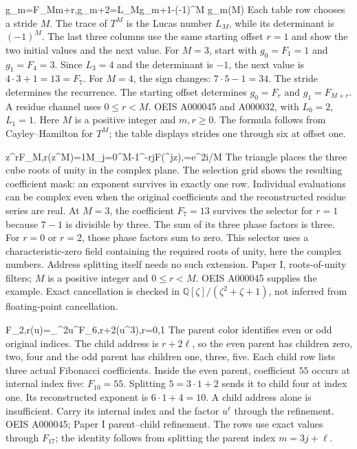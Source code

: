 {g_m=F_{Mm+r},\qquad g_{m+2}=L_Mg_{m+1}-(-1)^M g_m\quad(M)}
{Each table row chooses a stride $M$. The trace of $T^M$ is the Lucas number $L_M$, while its determinant is $(-1)^M$. The last three columns use the same starting offset $r=1$ and show the two initial values and the next value.}
{For $M=3$, start with $g_0=F_1=1$ and $g_1=F_4=3$. Since $L_3=4$ and the determinant is $-1$, the next value is $4\cdot3+1=13=F_7$. For $M=4$, the sign changes: $7\cdot5-1=34$.}
{The stride determines the recurrence. The starting offset determines $g_0=F_r$ and $g_1=F_{M+r}$. A residue channel uses $0\le r<M$.}
{OEIS A000045 and A000032, with $L_0=2$, $L_1=1$. Here $M$ is a positive integer and $m,r\ge0$. The formula follows from Cayley--Hamilton for $T^M$; the table displays strides one through six at offset one.}

{z^rF_{M,r}(z^M)=\frac1M\sum_{j=0}^{M-1}\zeta^{-rj}F(\zeta^jz),\qquad \zeta=e^{2\pi i/M}}
{The triangle places the three cube roots of unity in the complex plane. The selection grid shows the resulting coefficient mask: an exponent survives in exactly one row. Individual evaluations can be complex even when the original coefficients and the reconstructed residue series are real.}
{At $M=3$, the coefficient $F_7=13$ survives the selector for $r=1$ because $7-1$ is divisible by three. The sum of its three phase factors is three. For $r=0$ or $r=2$, those phase factors sum to zero.}
{This selector uses a characteristic-zero field containing the required roots of unity, here the complex numbers. Address splitting itself needs no such extension.}
{Paper I, roots-of-unity filters; $M$ is a positive integer and $0\le r<M$. OEIS A000045 supplies the example. Exact cancellation is checked in $\mathbb Q[\zeta]/(\zeta^2+\zeta+1)$, not inferred from floating-point cancellation.}

{F_{2,r}(u)=\sum_{}^2u^\ell F_{6,r+2\ell}(u^3),\qquad r=0,1}
{The parent color identifies even or odd original indices. The child address is $r+2\ell$, so the even parent has children zero, two, four and the odd parent has children one, three, five. Each child row lists three actual Fibonacci coefficients.}
{Inside the even parent, coefficient $55$ occurs at internal index five: $F_{10}=55$. Splitting $5=3\cdot1+2$ sends it to child four at index one. Its reconstructed exponent is $6\cdot1+4=10$.}
{A child address alone is insufficient. Carry its internal index and the factor $u^\ell$ through the refinement.}
{OEIS A000045; Paper I parent--child refinement. The rows use exact values through $F_{17}$; the identity follows from splitting the parent index $m=3j+\ell$.}


